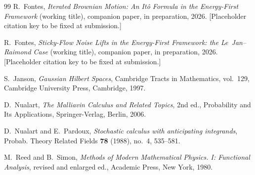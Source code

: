 \documentclass[11pt,reqno]{amsart}
\theoremstyle{plain}
\theoremstyle{definition}
\theoremstyle{remark}
\begin{document}
\begin{thebibliography}{99}
R.~Fontes,
\emph{Iterated Brownian Motion: An It\^o Formula in the Energy-First
Framework} (working title),
companion paper, in preparation, 2026. [Placeholder citation key to be
fixed at submission.]

R.~Fontes,
\emph{Sticky-Flow Noise Lifts in the Energy-First Framework: the
Le~Jan--Raimond Case} (working title),
companion paper, in preparation, 2026. [Placeholder citation key to be
fixed at submission.]

S.~Janson,
\emph{Gaussian Hilbert Spaces},
Cambridge Tracts in Mathematics, vol.~129,
Cambridge University Press, Cambridge, 1997.

D.~Nualart,
\emph{The Malliavin Calculus and Related Topics},
2nd ed., Probability and Its Applications,
Springer-Verlag, Berlin, 2006.

D.~Nualart and E.~Pardoux,
\emph{Stochastic calculus with anticipating integrands},
Probab. Theory Related Fields \textbf{78} (1988), no.~4, 535--581.

M.~Reed and B.~Simon,
\emph{Methods of Modern Mathematical Physics. I: Functional Analysis},
revised and enlarged ed., Academic Press, New York, 1980.

\end{thebibliography}
\end{document}
